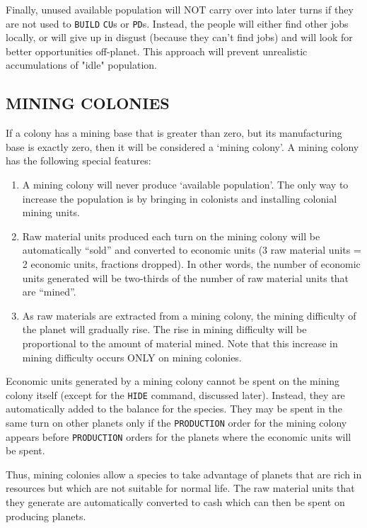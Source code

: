 \documentclass[10pt,titlepage]{article}
\begin{document}
Finally, unused available population will NOT carry over into later turns if
they are not used to \texttt{BUILD} \texttt{CU}s or \texttt{PD}s.  Instead, the people will either find
other jobs locally, or will give up in disgust (because they can't find jobs)
and will look for better opportunities off-planet.  This approach will prevent
unrealistic accumulations of "idle" population.


\subsection{MINING COLONIES}
\label{sec:miningcolonies}


If a colony has a mining base that is greater than zero, but its manufacturing
base is exactly zero, then it will be considered a `mining colony'.  A mining
colony has the following special features:
\begin{enumerate}
	\item A mining colony will never produce `available population'.  The
	only way to increase the population is by bringing in colonists and
	installing colonial mining units.

	\item Raw material units produced each turn on the mining colony will be
	automatically ``sold'' and converted to economic units (3 raw material
	units = 2 economic units, fractions dropped).  In other words, the
	number of economic units generated will be two-thirds of the number
	of raw material units that are ``mined''.

	\item As raw materials are extracted from a mining colony, the mining
	difficulty of the planet will gradually rise.  The rise in mining
	difficulty will be proportional to the amount of material mined.
	Note that this increase in mining difficulty occurs ONLY on mining
	colonies.
\end{enumerate}
Economic units generated by a mining colony cannot be spent on the mining
colony itself (except for the \texttt{HIDE} command, discussed later).  Instead, they
are automatically added to the balance for the species.  They may be spent in
the same turn on other planets only if the \texttt{PRODUCTION} order for the mining
colony appears before \texttt{PRODUCTION} orders for the planets where the economic
units will be spent.

Thus, mining colonies allow a species to take advantage of planets that are
rich in resources but which are not suitable for normal life.  The raw material
units that they generate are automatically converted to cash which can then be
spent on producing planets.
\end{document}
